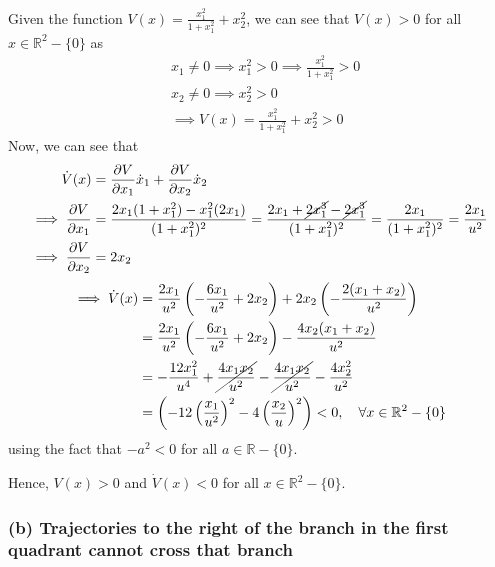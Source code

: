 Given the function \( \displaystyle V(x) = \frac{x_1^2}{1 + x_1^2} + x_2^2 \), we can see that \( V(x) > 0 \) for all \( x \in \mathbb{R}^2 - \{ 0 \} \) as
\begin{align*}
     &
    x_1 \neq 0
    \implies
    x_1^2 > 0
    \implies
    \frac{x_1^2}{1 + x_1^2} > 0
    \\ &
    x_2 \neq 0
    \implies
    x_2^2 > 0
    \\ &
    \implies
    V(x) =
    \frac{x_1^2}{1 + x_1^2} + x_2^2
    > 0
\end{align*}
Now, we can see that
\begin{align*}
    \dot{V}(x)
     & =
    \frac{\partial V}{\partial x_1} \dot{x}_1 + \frac{\partial V}{\partial x_2} \dot{x}_2
    \\
    \implies
    \frac{\partial V}{\partial x_1}
     & =
    \frac{2 x_1 (1 + x_1^2) - x_1^2 (2 x_1)}{(1 + x_1^2)^2}
    =
    \frac{2 x_1 + \cancel{2 x_1^3} - \cancel{2 x_1^3}}{(1 + x_1^2)^2}
    =
    \frac{2 x_1}{(1 + x_1^2)^2}
    =
    \frac{2 x_1}{u^2}
    \\
    \implies
    \frac{\partial V}{\partial x_2}
     & =
    2 x_2
\end{align*}
\begin{align*}
    \implies
    \dot{V}(x)
     & =
    \frac{2 x_1}{u^2} \left( -\frac{6 x_1}{u^2} + 2 x_2 \right) + 2 x_2 \left( -\frac{2 (x_1 + x_2)}{u^2} \right)
    \\ & =
    \frac{2 x_1}{u^2} \left( -\frac{6 x_1}{u^2} + 2 x_2 \right) - \frac{4 x_2 (x_1 + x_2)}{u^2}
    \\ & =
    -\frac{12 x_1^2}{u^4} + \cancel{\frac{4 x_1 x_2}{u^2}} - \cancel{\frac{4 x_1 x_2}{u^2}} - \frac{4 x_2^2}{u^2}
    \\ & =
    \left( -12 \left( \frac{x_1}{u^2} \right)^2 - 4 \left( \frac{x_2}{u} \right)^2 \right)
    <
    0,
    \quad
    \forall x \in \mathbb{R}^2 - \{ 0 \}
\end{align*}
using the fact that \( -a^2 < 0 \) for all \( a \in \mathbb{R} - \{ 0 \} \).

Hence, \( V(x) > 0 \) and \( \dot{V}(x) < 0 \) for all \( x \in \mathbb{R}^2 - \{ 0 \} \).

\subsubsection*{(b) Trajectories to the right of the branch in the first quadrant cannot cross that branch}

